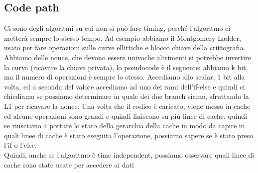 \documentclass[12pt, oneside]{extbook} %
\begin{document}
\subsection{Code path}
Ci sono degli algoritmi su cui non si può fare timing, perché l'algoritmo ci metterà sempre lo stesso tempo. Ad esempio abbiamo il Montgomery Ladder, usato per fare operazioni sulle curve ellittiche e blocco chiave della crittografia. Abbiamo delle nonce, che devono essere univoche altrimenti si potrebbe invertire la curva (ricavare la chiave privata), lo pseudocode è il seguente:
abbiamo k bit, ma il numero di operazioni è sempre lo stesso. Accediamo allo scalar, 1 bit alla volta, ed a seconda del valore accediamo ad uno dei rami dell'if-else e quindi ci chiediamo se possiamo determinare in quale dei due branch siamo, sfruttando la L1 per ricavare la nonce. Una volta che il codice è caricato, viene messo in cache ed alcune operazioni sono grandi e quindi finiscono su più linee di cache, quindi se riusciamo a portare lo stato della gerarchia della cache in modo da capire in quali linee di cache è stato eseguita l'operazione, possiamo sapere se è stato preso l'if o l'else.\\ Quindi, anche se l'algoritmo è time independent, possiamo osservare quali linee di cache sono state usate per accedere ai dati
\end{document}
